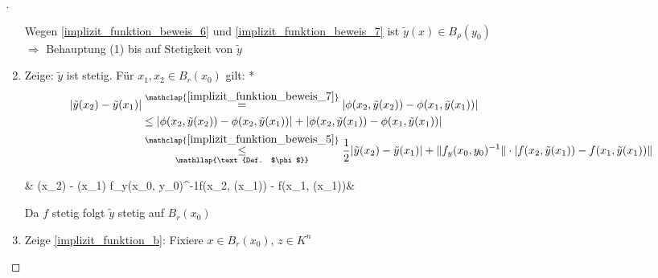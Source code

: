 \begin{proof}[]
\begin{enumerate}[label={\alph*)}]
		Wegen \eqref{implizit_funktion_beweis_6} und \eqref{implizit_funktion_beweis_7} ist $\tilde{y}(x)\in B_\rho(y_0)$ \\
		$\Rightarrow$ Behauptung (1) bis auf Stetigkeit von $\tilde{y}$
		
		\item Zeige: $\tilde{y}$ ist stetig. Für $x_1, x_2\in B_r(x_0)$ gilt: {\zeroAmsmathAlignVSpaces**\begin{align*}
			\vert \tilde{y}(x_2) - \tilde{y}(x_1)\vert &\overset{\mathclap{\eqref{implizit_funktion_beweis_7}}}{=} \vert \phi(x_2, \tilde{y}(x_2)) - \phi(x_1, \tilde{y}(x_1))\vert\\
			& \le \vert\phi(x_2, \tilde{y}(x_2)) - \phi(x_2, \tilde{y}(x_1))\vert + \vert \phi(x_2, \tilde{y}(x_1)) - \phi(x_1, \tilde{y}(x_1))\vert \\
			&\underset{\mathllap{\text{Def. $\phi$}}}{\overset{\mathclap{\eqref{implizit_funktion_beweis_5}}}{\le}} \frac{1}{2}\vert \tilde{y}(x_2) - \tilde{y}(x_1) \vert + \Vert f_y(x_0, y_0)^{-1}\Vert \cdot \vert f(x_2, \tilde{y}(x_1)) - f(x_1, \tilde{y}(x_1))\Vert
		\end{align*}}
		{\zeroAmsmathAlignVSpaces*\begin{flalign}
			\Rightarrow\;\; & \vert \tilde{y}(x_2) - (x_1)\vert {} \Vert f_y(x_0, y_0)^{-1}\Vert \vert f(x_2, (x_1)) - f(x_1, (x_1))\vert &
		\end{flalign}}
		Da $f$ stetig folgt $\tilde{y}$ stetig auf $B_r(x_0)$
		
		\item Zeige \ref{implizit_funktion_b}: Fixiere $x\in B_r(x_0)$, $z\in K^n$
		

\end{enumerate}
\end{proof}
